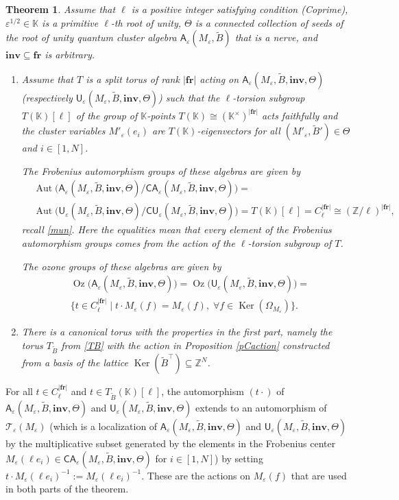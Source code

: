 \documentclass[11pt]{amsart}
\theoremstyle{plain}
\newtheorem{theorem}{Theorem}[section]
\newcommand \bth[1] { \begin{theorem}\label{t#1} }
\renewcommand {\eth} { \end{theorem} }
\newcommand \prref[1]{Proposition \ref{p#1}}
\def \KK {{\mathbb C}}
\def \KK {{\mathbb K}}
\def \Zset {{\mathbb Z}}
\def \A {{\boldsymbol{\mathsf A}}}
\def \C {{\boldsymbol{\mathsf C}}}
\def \U {{\boldsymbol{\mathsf U}}}
\def \B  {{\widetilde{B}}}
\newcommand \fr {{\mathbf{fr}}}
\newcommand \inv {{\mathbf{inv}}}
\def \TT {{\mathcal{T}}}
\def \Om {\Omega}
\def \ep {\varepsilon}
\DeclareMathOperator \Aut { {\mathrm{Aut}} }
\DeclareMathOperator \Oz { {\mathrm{Oz}}}
\DeclareMathOperator \Ker { {\mathrm{Ker}} }
\begin{document}
\bth{torus} Assume that $\ell$ is a positive integer satisfying condition (Coprime), $\ep^{1/2} \in \KK$ is a primitive $\ell$-th root of unity, 
$\Theta$ is a connected collection of seeds of the root of unity quantum cluster algebra $\A_\ep(M_\ep, \B)$ that is a nerve, and $\inv \subseteq \fr$ is arbitrary. 
\begin{enumerate}
\item[(i)] Assume that $T$ is a split torus of rank 
$|\fr|$ acting on $\A_\ep(M_\ep, \B, \inv, \Theta)$ (respectively $\U_\ep(M_\ep, \B, \inv, \Theta)$)
such that the $\ell$-torsion subgroup $T(\KK)[\ell]$ of the group 
of $\KK$-points $T(\KK) \cong (\KK^\times)^{|\fr|}$ acts faithfully and the cluster variables $M'_\ep(e_i)$ are 
$T(\KK)$-eigenvectors for all $(M'_\ep, \B') \in \Theta$ and $i \in [1,N]$.

The Frobenius automorphism groups of these algebras are given by 
\begin{align*}
&\Aut \big(
\A_\ep(M_\ep, \B, \inv, \Theta)/
\C\A_\ep(M_\ep, \B, \inv, \Theta) \big) = \\
&\Aut \big(
\U_\ep(M_\ep, \B, \inv, \Theta)/
\C\U_\ep(M_\ep, \B, \inv, \Theta) \big) = 
T(\KK)[\ell] = C_\ell^{|\fr|} \cong (\Zset/\ell)^{|\fr|},
\end{align*}
recall \eqref{mun}. Here the equalities mean that every element of the Frobenius automorphism 
groups comes from the action of the $\ell$-torsion subgroup of $T$.

The ozone groups of these algebras are given by 
\begin{align*}
&\Oz \big( \A_\ep(M_\ep, \B, \inv, \Theta) \big) =
\Oz \big( \U_\ep(M_\ep, \B, \inv, \Theta) \big) = 
\\
&\{ t \in C_\ell^{|\fr|} \mid t \cdot M_\ep(f) = M_\ep(f), \; \forall 
f \in \Ker (\Om_{M_\ep})\}.
\end{align*}
\item[(ii)] There is a canonical torus with the properties in the first part, namely the torus $T_{\B}$ from \eqref{TB} with 
the action in \prref{Caction} constructed from a basis of the lattice $\Ker(\B^\top) \subseteq \Zset^N$.  
\end{enumerate}
\eth

For all $t \in C_\ell^{|\fr|}$ and $t \in T_{\B}(\KK)[\ell]$, the automorphism $(t \cdot)$ of $\A_\ep(M_\ep, \B, \inv, \Theta)$ and $\U_\ep(M_\ep, \B, \inv, \Theta)$ extends to an automorphism of $\TT_\ep(M_\ep)$ (which is a localization of $\A_\ep(M_\ep, \B, \inv, \Theta)$ 
and $\U_\ep(M_\ep, \B, \inv, \Theta)$ by the multiplicative subset generated by the elements in the Frobenius center  
$M_\ep(\ell e_i) \in \C\A_\ep(M_\ep, \B, \inv, \Theta)$
for $i \in [1,N]$) by setting $t \cdot M_\ep(\ell e_i)^{-1} := M_\ep(\ell e_i)^{-1}$.
These are the actions on $M_\ep(f)$ that are used in both parts of the theorem. 
\end{document}
